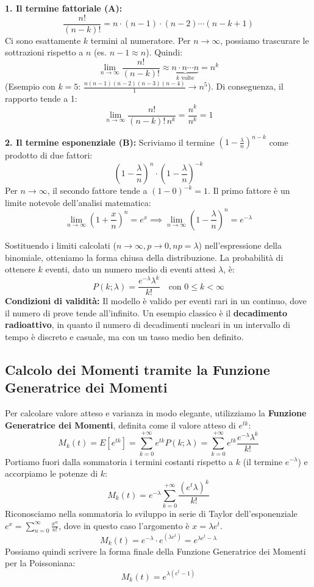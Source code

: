 \documentclass[openany,a4paper,12pt]{book}
\theoremstyle{remark}
\begin{document}
\textbf{1. Il termine fattoriale (A):}
\[
\frac{n!}{(n-k)!} = n \cdot (n-1) \cdot (n-2) \cdots (n-k+1)
\]
Ci sono esattamente $k$ termini al numeratore. Per $n \to \infty$, possiamo trascurare le sottrazioni rispetto a $n$ (es. $n-1 \approx n$). Quindi:
\[
\lim_{n \to \infty} \frac{n!}{(n-k)!} \approx \underbrace{n \cdot n \cdots n}_{k \text{ volte}} = n^k
\]
(Esempio con $k=5$: $\frac{n(n-1)(n-2)(n-3)(n-4)}{1} \to n^5$).
Di conseguenza, il rapporto tende a 1:
\[
\lim_{n \to \infty} \frac{n!}{(n-k)! \, n^k} = \frac{n^k}{n^k} = 1
\]

\textbf{2. Il termine esponenziale (B):}
Scriviamo il termine $\left(1 - \frac{\lambda}{n}\right)^{n-k}$ come prodotto di due fattori:
\[
\left(1 - \frac{\lambda}{n}\right)^{n} \cdot \left(1 - \frac{\lambda}{n}\right)^{-k}
\]
Per $n \to \infty$, il secondo fattore tende a $(1-0)^{-k} = 1$.
Il primo fattore è un limite notevole dell'analisi matematica:
\[
\lim_{n \to \infty} \left(1 + \frac{x}{n}\right)^n = e^x \implies \lim_{n \to \infty} \left(1 - \frac{\lambda}{n}\right)^n = e^{-\lambda}
\]

Sostituendo i limiti calcolati ($n \to \infty, p \to 0, np=\lambda$) nell'espressione della binomiale, otteniamo la forma chiusa della distribuzione.
La probabilità di ottenere $k$ eventi, dato un numero medio di eventi attesi $\lambda$, è:
\begin{equation}
\boxed{P(k; \lambda) = \frac{e^{-\lambda} \lambda^k}{k!} \quad \text{con } 0 \le k < \infty}
\end{equation}
\textbf{Condizioni di validità:} Il modello è valido per eventi rari in un continuo, dove il numero di prove tende all'infinito.
Un esempio classico è il \textbf{decadimento radioattivo}, in quanto il numero di decadimenti nucleari in un intervallo di tempo è discreto e casuale, ma con un tasso medio ben definito.


\subsection*{Calcolo dei Momenti tramite la Funzione Generatrice dei Momenti}
Per calcolare valore atteso e varianza in modo elegante, utilizziamo la \textbf{Funzione Generatrice dei Momenti}, definita come il valore atteso di $e^{tk}$:
\[
M_k(t) = E[e^{tk}] = \sum_{k=0}^{+\infty} e^{tk} P(k; \lambda) = \sum_{k=0}^{+\infty} e^{tk} \frac{e^{-\lambda} \lambda^k}{k!}
\]
Portiamo fuori dalla sommatoria i termini costanti rispetto a $k$ (il termine $e^{-\lambda}$) e accorpiamo le potenze di $k$:
\[
M_k(t) = e^{-\lambda} \sum_{k=0}^{+\infty} \frac{(e^t \lambda)^k}{k!}
\]
Riconosciamo nella sommatoria lo sviluppo in serie di Taylor dell'esponenziale $e^x = \sum_{n=0}^{\infty} \frac{x^n}{n!}$, dove in questo caso l'argomento è $x = \lambda e^t$.
\[
M_k(t) = e^{-\lambda} \cdot e^{(\lambda e^t)} = e^{\lambda e^t - \lambda}
\]
Possiamo quindi scrivere la forma finale della Funzione Generatrice dei Momenti per la Poissoniana:
\begin{equation}
\boxed{M_k(t) = e^{\lambda(e^t - 1)}}
\end{equation}
\end{document}
